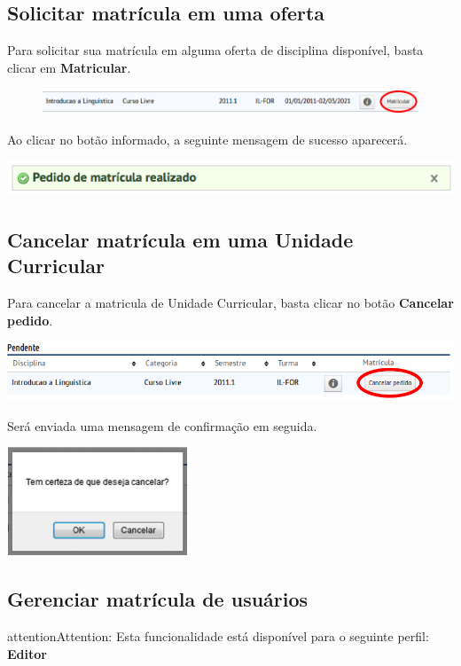 \documentclass[letterpaper,10pt,english]{sphinxmanual}
\begin{document}
\subsection{Solicitar matrícula em uma oferta}
\label{enrollment:solicitar-matricula-em-uma-oferta}\label{enrollment:enrollment-request}
Para solicitar sua matrícula em alguma oferta de disciplina disponível, basta clicar em \textbf{Matricular}.
\begin{figure}[htbp]
\centering

\includegraphics{enrollment-request.png}
\end{figure}

Ao clicar no botão informado, a seguinte mensagem de sucesso aparecerá.

{\hfill\includegraphics{enrollment-request-success.png}\hfill}


\subsection{Cancelar matrícula em uma Unidade Curricular}
\label{enrollment:cancelar-matricula-em-uma-unidade-curricular}\label{enrollment:enrollment-cancel}
Para cancelar a matricula de Unidade Curricular, basta clicar no botão \textbf{Cancelar pedido}.

{\hfill\includegraphics{enrollment-cancel-01.png}\hfill}

Será enviada uma mensagem de confirmação em seguida.

{\hfill\includegraphics{enrollment-cancel-02.png}\hfill}


\subsection{Gerenciar matrícula de usuários}
\label{enrollment:enrollment-manage}\label{enrollment:gerenciar-matricula-de-usuarios}
\begin{notice}{attention}{Attention:}
Esta funcionalidade está disponível para o seguinte perfil: \textbf{Editor}
\end{notice}
\end{document}
